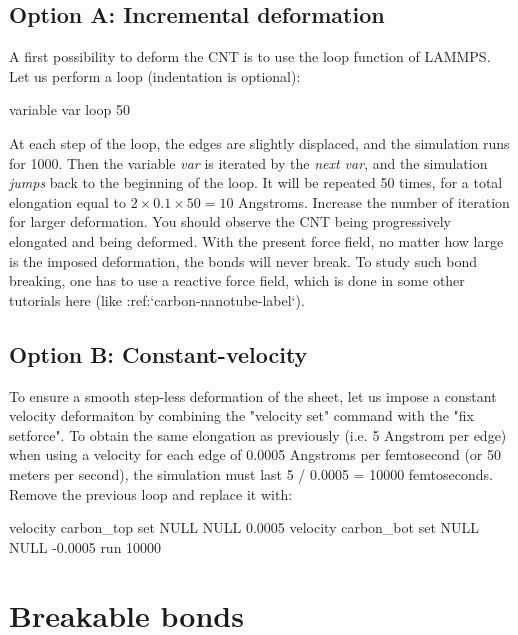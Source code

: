 \subsection{Option A: Incremental deformation}

\noindent A first possibility to deform the CNT is to 
use the loop function of LAMMPS. 
Let us perform a loop (indentation is optional):

\begin{lcverbatim}
variable var loop 50
\end{lcverbatim}

\noindent At each step of the loop, the edges are slightly displaced, and
the simulation runs for 1000. Then the variable \textit{var} is iterated
by the \textit{next var}, and the simulation \textit{jumps} back to the beginning of 
the loop. It will be repeated 50 times, for a total elongation
equal to $2 \times 0.1 \times 50 = 10$ Angstroms. Increase the number of iteration 
for larger deformation.
You should observe the CNT being progressively elongated
and being deformed.
With the present force field, no matter how large is the
imposed deformation, the bonds will never break. To study
such bond breaking, one has to use a reactive force
field, which is done in some other tutorials here (like :ref:`carbon-nanotube-label`).

\subsection{Option B: Constant-velocity}

\noindent To ensure a smooth step-less deformation of the sheet,
let us impose a constant velocity deformaiton by combining
the "velocity set" command with the "fix setforce". 
To obtain the same elongation as previously (i.e. 5 Angstrom 
per edge) when using a velocity for each edge of 0.0005 Angstroms per
femtosecond (or 50 meters per second), the simulation 
must last 5 / 0.0005 = 10000 femtoseconds. 
Remove the previous loop and replace it with:

\begin{lcverbatim}
velocity carbon_top set NULL NULL 0.0005
velocity carbon_bot set NULL NULL -0.0005
run 10000
\end{lcverbatim}

\noindent \section{Breakable bonds}

